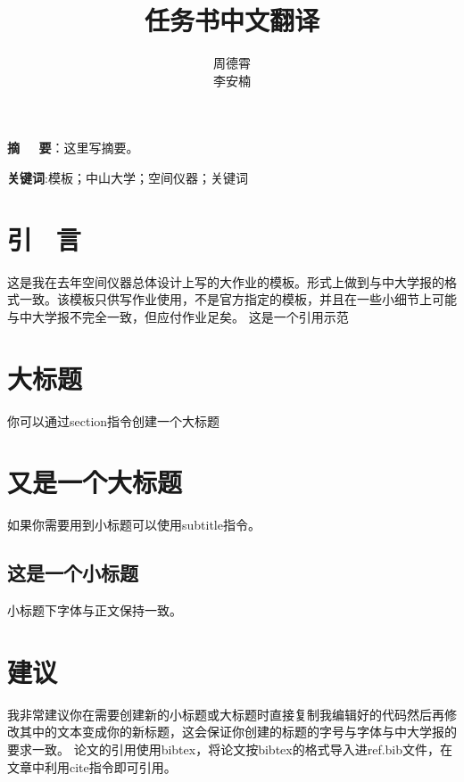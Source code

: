 \documentclass{article}
\title{\zihao{2}\songti \textbf{任务书中文翻译}}
\author{\zihao{-4}\kaishu 周德霄\\ \zihao{-4}\kaishu 李安楠}
\affil{\zihao{5}\kaishu 埃尔朗根-纽伦堡大学，德国 \ 埃尔朗根91052}
\affil{\zihao{5}\kaishu 奔曜科技有限公司，中国 \ 上海}
\date{}
\begin{document}
\maketitle
\thispagestyle{mystyle}
\noindent
{}\songti \textbf{摘 \ \ 要}：这里写摘要。

\noindent
\textbf{关键词}:模板；中山大学；空间仪器；关键词
\setlength\columnsep{0.8cm} %
\begin{multicols}{2} %


\section{\kaishu 引 \ 言}
\songti 这是我在去年空间仪器总体设计上写的大作业的模板。形式上做到与中大学报的格式一致。该模板只供写作业使用，不是官方指定的模板，并且在一些小细节上可能与中大学报不完全一致，但应付作业足矣。 这是一个引用示范\cite{1998Gravitational}


\section{\kaishu 大标题}
你可以通过section指令创建一个大标题


\section{\kaishu 又是一个大标题}
如果你需要用到小标题可以使用subtitle指令。

\subsection{\songti 这是一个小标题}
小标题下字体与正文保持一致。

\section{\kaishu 建议}
我非常建议你在需要创建新的小标题或大标题时直接复制我编辑好的代码然后再修改其中的文本变成你的新标题，这会保证你创建的标题的字号与字体与中大学报的要求一致。
论文的引用使用bibtex，将论文按bibtex的格式导入进ref.bib文件，在文章中利用cite指令即可引用。
\end{multicols} %

\end{document}
